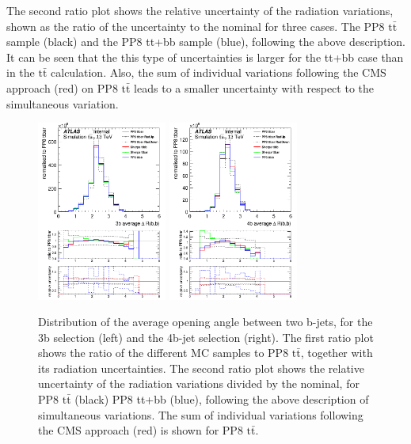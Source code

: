 The second ratio plot shows the relative uncertainty of the radiation variations, shown as the ratio of the uncertainty to the nominal for three cases. The PP8 $\mathrm{t\bar{t}}$ sample (black) and the PP8 tt+bb sample (blue), following the above description. It can be seen that the this type of uncertainties is larger for the tt+bb case than in the $\mathrm{t\bar{t}}$ calculation.
Also, the sum of individual variations following the CMS approach (red) on PP8 $\mathrm{t\bar{t}}$ leads to a smaller uncertainty with respect to the simultaneous variation.


\begin{figure}[!htb]
\centering
\includegraphics[width=0.38\textwidth]{Plots/ttbb/hisgenEvt_Dr_GenBJetsAverage_4j3t__div}
\includegraphics[width=0.38\textwidth]{Plots/ttbb/hisgenEvt_Dr_GenBJetsAverage_4j4t__div}
  \caption{Distribution of the average opening angle between two b-jets, for the 3b selection (left) and the 4b-jet selection (right). The first ratio plot shows the ratio of the different MC samples to PP8 $\mathrm{t\bar{t}}$, together with its radiation uncertainties. The second ratio plot shows the relative uncertainty of the radiation variations divided by the nominal, for PP8 $\mathrm{t\bar{t}}$ (black) PP8 tt+bb (blue), following the above description of simultaneous variations. The sum of individual variations following the CMS approach (red) is shown for PP8 $\mathrm{t\bar{t}}$.  \label{ttbb:avedR}}
\end{figure}

